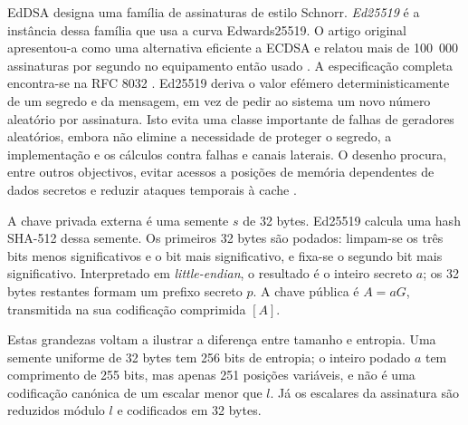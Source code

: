 EdDSA designa uma família de assinaturas de estilo Schnorr. {\em Ed25519} é a
instância dessa família que usa a curva Edwards25519. O artigo original
apresentou-a como uma alternativa eficiente a ECDSA e relatou mais de 100~000
assinaturas por segundo no equipamento então usado \cite{Bernstein2012}. A
especificação completa encontra-se na RFC 8032 \cite{rfc8032}.
Ed25519 deriva o valor efémero deterministicamente de um segredo e da mensagem,
em vez de pedir ao sistema um novo número aleatório por assinatura. Isto evita
uma classe importante de falhas de geradores aleatórios, embora não elimine a
necessidade de proteger o segredo, a implementação e os cálculos contra falhas
e canais laterais. O desenho procura, entre outros objectivos, evitar acessos a
posições de memória dependentes de dados secretos e reduzir ataques temporais à
cache \cite{Bernstein2012}.

A chave privada externa é uma semente \(s\) de 32 bytes. Ed25519 calcula uma
hash SHA-512 dessa semente. Os primeiros 32 bytes são podados: limpam-se os
três bits menos significativos e o bit mais significativo, e fixa-se o segundo
bit mais significativo. Interpretado em {\em little-endian}, o resultado é o
inteiro secreto \(a\); os 32 bytes restantes formam um prefixo secreto \(p\).
A chave pública é \(A=aG\), transmitida na sua codificação comprimida \([A]\).

Estas grandezas voltam a ilustrar a diferença entre tamanho e entropia. Uma
semente uniforme de 32 bytes tem 256 bits de entropia; o inteiro podado \(a\)
tem comprimento de 255 bits, mas apenas 251 posições variáveis, e não é uma
codificação canónica de um escalar menor que \(l\). Já os escalares da
assinatura são reduzidos módulo \(l\) e codificados em 32 bytes.

